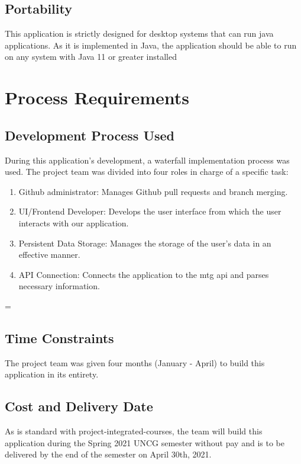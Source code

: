 \documentclass[12pt]{report}
\newcommand{\javaversion}{11 }
\newenvironment{unbroken}
{\par\nobreak\vfil\penalty0\vfilneg
	\vtop\bgroup}
{\par\xdef\tpd{\the\prevdepth}\egroup
	\prevdepth=\tpd}
\begin{document}
\subsection{Portability}
This application is strictly designed for desktop systems that can run java applications. As it is implemented in Java, the application should be able to run on any system with Java \javaversion or greater installed
\begin{unbroken}
\section{Process Requirements}
\subsection{Development Process Used}
During this application’s development, a waterfall implementation process was used. The project team was divided into four roles in charge of a 
specific task:
\begin{enumerate}
	\item Github administrator: Manages Github pull requests and branch merging.
	\item UI/Frontend Developer: Develops the user interface from which the user interacts with our application.
	\item Persistent Data Storage: Manages the storage of the user’s data in an effective manner.
	\item API Connection: Connects the application to the \acrshort{mtg} \acrshort{api} and parses necessary information.
\end{enumerate}
\end{unbroken}
\subsection{Time Constraints}
The project team was given four months (January - April) to build this application in its entirety.
\subsection{Cost and Delivery Date}
As is standard with project-integrated-courses, the team will build this 
application during the Spring 2021 UNCG semester without pay and is to be delivered by the end of the semester on April 30th, 2021. 
\end{document}
